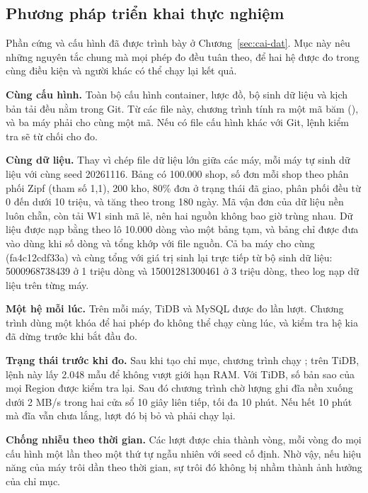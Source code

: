 
\subsection{Phương pháp triển khai thực nghiệm}

Phần cứng và cấu hình đã được trình bày ở Chương~\ref{sec:cai-dat}. Mục này nêu những nguyên tắc chung mà mọi phép đo đều tuân theo, để hai hệ được đo trong cùng điều kiện và người khác có thể chạy lại kết quả.

\textbf{Cùng cấu hình.} Toàn bộ cấu hình container, lược đồ, bộ sinh dữ liệu và kịch bản tải đều nằm trong Git. Từ các file này, chương trình tính ra một mã băm (), và ba máy phải cho cùng một mã. Nếu có file cấu hình khác với Git, lệnh kiểm tra sẽ từ chối cho đo.

\textbf{Cùng dữ liệu.} Thay vì chép file dữ liệu lớn giữa các máy, mỗi máy tự sinh dữ liệu với cùng seed 20261116. Bảng có 100.000 shop, số đơn mỗi shop theo phân phối Zipf (tham số 1,1), 200 kho, 80\% đơn ở trạng thái đã giao,  phân phối đều từ 0 đến dưới 10 triệu, và  tăng theo  trong 180 ngày. Mã vận đơn của dữ liệu nền luôn chẵn, còn tải W1 sinh mã lẻ, nên hai nguồn không bao giờ trùng nhau. Dữ liệu được nạp bằng  theo lô 10.000 dòng vào một bảng tạm, và bảng chỉ được đưa vào dùng khi số dòng và tổng  khớp với file nguồn. Cả ba máy cho cùng  (fa4c12cdf33a) và cùng tổng  với giá trị sinh lại trực tiếp từ bộ sinh dữ liệu: 5000968738439 ở 1 triệu dòng và 15001281300461 ở 3 triệu dòng, theo log nạp dữ liệu trên từng máy.

\textbf{Một hệ mỗi lúc.} Trên mỗi máy, TiDB và MySQL được đo lần lượt. Chương trình dùng một khóa để hai phép đo không thể chạy cùng lúc, và kiểm tra hệ kia đã dừng trước khi bắt đầu đo.

\textbf{Trạng thái trước khi đo.} Sau khi tạo chỉ mục, chương trình chạy ; trên TiDB, lệnh này lấy 2.048 mẫu để không vượt giới hạn RAM. Với TiDB, số bản sao của mọi Region được kiểm tra lại. Sau đó chương trình chờ lượng ghi đĩa nền xuống dưới 2 MB/s trong hai cửa sổ 10 giây liên tiếp, tối đa 10 phút. Nếu hết 10 phút mà đĩa vẫn chưa lắng, lượt đó bị bỏ và phải chạy lại.

\textbf{Chống nhiễu theo thời gian.} Các lượt được chia thành vòng, mỗi vòng đo mọi cấu hình một lần theo một thứ tự ngẫu nhiên với seed cố định. Nhờ vậy, nếu hiệu năng của máy trôi dần theo thời gian, sự trôi đó không bị nhầm thành ảnh hưởng của chỉ mục.

